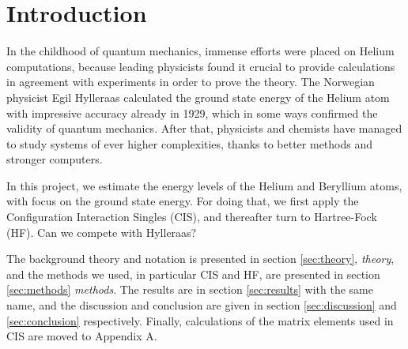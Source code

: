\section{Introduction} \label{sec:introduction}
In the childhood of quantum mechanics, immense efforts were placed on Helium computations, because leading physicists found it crucial to provide calculations in agreement with experiments in order to prove the theory. The Norwegian physicist Egil Hylleraas calculated the ground state energy of the Helium atom with impressive accuracy already in 1929, which in some ways confirmed the validity of quantum mechanics. After that, physicists and chemists have managed to study systems of ever higher complexities, thanks to better methods and stronger computers.

In this project, we estimate the energy levels of the Helium and Beryllium atoms, with focus on the ground state energy. For doing that, we first apply the Configuration Interaction Singles (CIS), and thereafter turn to Hartree-Fock (HF). Can we compete with Hylleraas?

The background theory and notation is presented in section \eqref{sec:theory}, \textit{theory}, and the methods we used, in particular CIS and HF, are presented in section \eqref{sec:methods} \textit{methods}. The results are in section \eqref{sec:results} with the same name, and the discussion and conclusion are given in section \eqref{sec:discussion} and \eqref{sec:conclusion} respectively. Finally, calculations of the matrix elements used in CIS are moved to Appendix A.
